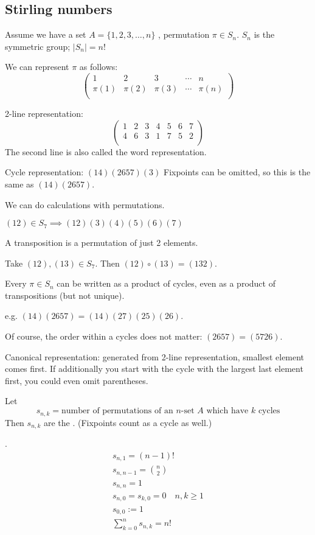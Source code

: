 \subsection{Stirling numbers}
Assume we have a set $A = \{1,2,3, \ldots ,n\}$
, permutation $\pi\in S_n$.
$S_n$ is the symmetric group; $|S_n| = n!$

We can represent $\pi$ as follows:
\[
  \begin{pmatrix}
    1&2&3&\cdots&n \\
    \pi(1)&\pi(2)&\pi(3)&\cdots&\pi(n) \\
  \end{pmatrix}
\]

2-line representation:
\[
  \begin{pmatrix}
    1&2&3&4&5&6&7 \\
    4&6&3&1&7&5&2 \\
  \end{pmatrix}
\]
The second line is also called the word representation.

Cycle representation:
$(1 4) (2 6 5 7) (3)$
Fixpoints can be omitted, so this is the same as $(14)(2657)$.

We can do calculations with permutations.

$(12)\in S_7 \implies (12)(3)(4)(5)(6)(7)$

A transposition is a permutation of just 2 elements.

Take $(12),(13)\in S_7$. Then $(12)\circ (13) = (132)$.

Every $\pi\in S_n$ can be written as a product of cycles, even as a product of transpositions (but not unique).

e.g. $(14)(2657) = (14)(27)(25)(26)$.

Of course, the order within a cycles does not matter:
$(2657)=(5726)$.

Canonical representation: generated from 2-line representation, smallest element comes first.
If additionally you start with the cycle with the largest last element first, you could even omit parentheses.

\begin{definition}
Let
\[
  s_{n,k} = \text{number of permutations of an $n$-set $A$ which have $k$ cycles}
\]
Then $s_{n,k}$ are the .
(Fixpoints count as a cycle as well.)
\end{definition}

\Remark.
\begin{gather*}
  s_{n,1} = (n-1)! \\
  s_{n,n-1} = {n\choose 2} \\
  s_{n,n} = 1 \\
  s_{n,0} = s_{k,0} = 0 \quad n,k ≥ 1 \\
  s_{0,0} := 1 \\
  \sum_{k=0}^{n} s_{n,k} = n!
\end{gather*}

